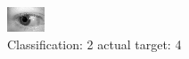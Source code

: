 \begin{figure}[h!]
\begin{center}
\includegraphics[width=0.60\columnwidth]{figures/ID856_class_2_target_4.png}
\end{center}
\caption{ Classification: 2 actual target: 4}
\label{fig:ID856_class_2_target_4}
\end{figure}
